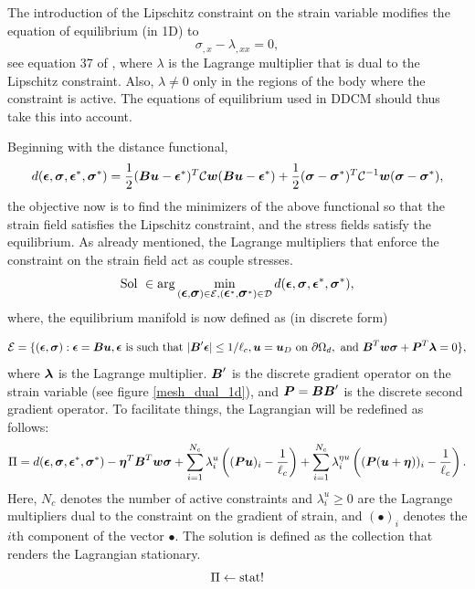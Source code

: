 \documentclass[10pt]{elsarticle}
\begin{document}
The introduction of the Lipschitz constraint on the strain variable modifies the equation of equilibrium (in 1D) to 
\begin{equation}
	\sigma_{,x}- \lambda_{,xx}=0,\label{equil_couple_1D}
\end{equation}
see equation 37 of \cite{Kamasamudram2023}, where $\lambda$ is the Lagrange multiplier that is dual to the Lipschitz constraint. Also, $\lambda \neq 0$ only in the regions of the body where the constraint is active. The equations of equilibrium used in DDCM should thus take this into account. 

Beginning with the distance functional,
\begin{equation}
	d(\mbox{\boldmath $\epsilon$},\mbox{\boldmath $\sigma$},\mbox{\boldmath $\epsilon$}^*,\mbox{\boldmath $\sigma$}^*) = \frac{1}{2}(\mbox{\boldmath $B$} \mbox{\boldmath $u$} - \mbox{\boldmath $\epsilon$}^*)^T\mathcal{C}\mbox{\boldmath $w$}(\mbox{\boldmath $B$} \mbox{\boldmath $u$} - \mbox{\boldmath $\epsilon$}^*) + \frac{1}{2}(\mbox{\boldmath $\sigma$} - \mbox{\boldmath $\sigma$}^*)^T\mathcal{C}^{-1}\mbox{\boldmath $w$}(\mbox{\boldmath $\sigma$} - \mbox{\boldmath $\sigma$}^*),
\end{equation}
the objective now is to find the minimizers of the above functional so that the strain field satisfies the Lipschitz constraint, and the stress fields satisfy the equilibrium. As already mentioned, the Lagrange multipliers that enforce the constraint on the strain field act as couple stresses.
\begin{equation}
	\text{Sol } \in \arg \min_{(\mbox{\boldmath $\epsilon$},\mbox{\boldmath $\sigma$}) \in \mathcal{E}, (\mbox{\boldmath $\epsilon$}^*,\mbox{\boldmath $\sigma$}^*) \in \mathcal{D}} d(\mbox{\boldmath $\epsilon$},\mbox{\boldmath $\sigma$},\mbox{\boldmath $\epsilon$}^*,\mbox{\boldmath $\sigma$}^*),
\end{equation}
where, the equilibrium manifold is now defined as (in discrete form)
 

\begin{equation}
	\mathcal{E} = \{(\mbox{\boldmath $\epsilon$},\mbox{\boldmath $\sigma$}) : \mbox{\boldmath $\epsilon$} = \mbox{\boldmath $B$} \mbox{\boldmath $u$}, \mbox{\boldmath $\epsilon$} \text{ is such that } |\mbox{\boldmath $B$}' \mbox{\boldmath $\epsilon$}|  \leq 1/{\ell_c} ,\mbox{\boldmath $u$} = \mbox{\boldmath $u$}_D \text{ on } \partial \Omega_d,
	\text{ and } \mbox{\boldmath $B$} ^T\mbox{\boldmath $w$} \mbox{\boldmath $\sigma$} + \mbox{\boldmath $P$}^T \mbox{\boldmath $\lambda$} = 0     \},
\end{equation}
where $\mbox{\boldmath $\lambda$}$ is the Lagrange multiplier. $\mbox{\boldmath $B$}'$ is the discrete gradient operator on the strain variable (see figure \ref{mesh_dual_1d}), and $\mbox{\boldmath $P$} = \mbox{\boldmath $B$} \mbox{\boldmath $B$}'$ is the discrete second gradient operator. To facilitate things, the Lagrangian will be redefined as follows:
\begin{equation}
	\Pi = d(\mbox{\boldmath $\epsilon$},\mbox{\boldmath $\sigma$},\mbox{\boldmath $\epsilon$}^*,\mbox{\boldmath $\sigma$}^*) - \mbox{\boldmath $\eta$}^T \mbox{\boldmath $B$} ^T \mbox{\boldmath $w$}\mbox{\boldmath $\sigma$} + \sum_{i=1}^{N_c} \lambda^u_i \left( (\mbox{\boldmath $P$} \mbox{\boldmath $u$})_i - \frac{1}{\ell_c}   \right) + \sum_{i=1}^{N_c} \lambda^{\eta u}_i \left( (\mbox{\boldmath $P$} (\mbox{\boldmath $u$} + \mbox{\boldmath $\eta$}))_i - \frac{1}{\ell_c}   \right).
\end{equation}
Here, $N_c$ denotes the number of active constraints and $\lambda^u_i \geq 0$ are the Lagrange multipliers dual to the constraint on the gradient of strain, and $(\bullet)_i$ denotes the $i$th component of the vector $\bullet$. The solution is defined as the collection that renders the Lagrangian stationary.
\begin{equation}
	\Pi  \leftarrow \operatorname{stat}!
\end{equation}
\end{document}
